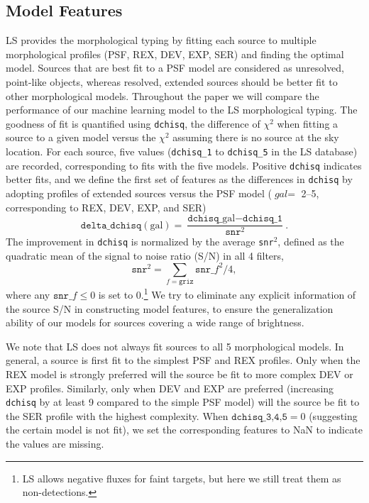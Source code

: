 \documentclass[twocolumn]{aastex631}
\begin{document}
\begin{CJK*}{UTF8}{gbsn}
\section{Model Features}\label{sec:features}
LS provides the morphological typing by fitting each source to multiple morphological profiles (PSF, REX, DEV, EXP, SER) and finding the optimal model. Sources that are best fit to a PSF model are considered as unresolved, point-like objects, whereas resolved, extended sources should be better fit to other morphological models. Throughout the paper we will compare the performance of our machine learning model to the LS morphological typing. 
The goodness of fit is quantified using \texttt{dchisq}, the difference of $\chi^2$ when fitting a source to a given model versus the $\chi^2$ assuming there is no source at the sky location. For each source, five values (\texttt{dchisq\_1} to \texttt{dchisq\_5} in the LS database) are recorded, corresponding to fits with the five models. Positive \texttt{dchisq} indicates better fits, and we define the first set of features as the differences in {\tt dchisq} by adopting profiles of extended sources versus the PSF model ($\textit{gal}=$ 2--5, corresponding to REX, DEV, EXP, and SER)
\begin{equation}\label{eq:feat_dchisq}
    \texttt{delta\_dchisq}(\text{gal}) = \frac{\texttt{dchisq\_}{\text{gal}} - \texttt{dchisq\_1}}{\texttt{snr}^2}.
\end{equation}
The improvement in {\tt dchisq} is normalized by the average \texttt{snr}$^2$, defined as the quadratic mean of the signal to noise ratio (S/N) in all 4 filters,
\begin{equation}
    \texttt{snr}^2 = \sum_{f=\texttt{griz}} \texttt{snr\_}{f}^2/4,
\end{equation}
where any $\texttt{snr\_}f\le 0$ is set to 0.\footnote{LS allows negative fluxes for faint targets, but here we still treat them as non-detections.} We try to eliminate any explicit information of the source S/N in constructing model features, to ensure the generalization ability of our models for sources covering a wide range of brightness. 

We note that LS does not always fit sources to all 5 morphological models. In general, a source is first fit to the simplest PSF and REX profiles. Only when the REX model is strongly preferred will the source be fit to more complex DEV or EXP profiles. Similarly, only when DEV and EXP are preferred (increasing \texttt{dchisq} by at least 9 compared to the simple PSF model) will the source be fit to the SER profile with the highest complexity. When $\texttt{dchisq\_3,4,5}=0$ (suggesting the certain model is not fit), we set the corresponding features to NaN to indicate the values are missing.


\end{CJK*}
\end{document}
